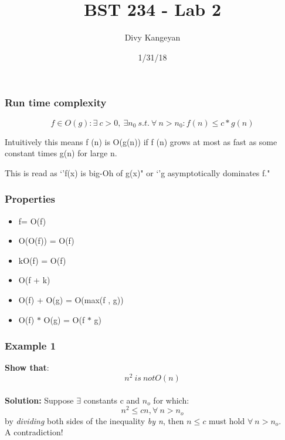 \documentclass{beamer}
\title[BST 234 Lab 2]{BST 234 - Lab 2} %
\author{Divy Kangeyan} %
\institute[ ] %
{
  \\ %
\medskip
\textit{ } %
}
\date{1/31/18}%
\begin{document}
\begin{frame}
\titlepage %
\end{frame}

 

 
 
\begin{frame}
\frametitle{Run time complexity}
 
$$f \in O(g) : \exists \ c>0, \ \exists n_{0} \ s.t. \ \forall \ n>n_{0} : f (n) \le  c*g(n)$$
 
\vspace{1.3cm}
Intuitively this means f (n) is O(g(n)) if f (n) grows at most as fast
as some constant times g(n) for large n. 


This is read as `'f(x) is big-Oh of g(x)" or `'g asymptotically dominates f."
 

\end{frame}



\begin{frame}
\frametitle{Properties}

\begin{itemize}
\item f= O(f) %
\item O(O(f)) = O(f)
\item kO(f) = O(f)
\item O(f + k)
\item O(f) + O(g) = O(max(f , g))
\item O(f) $*$ O(g) = O(f $*$ g)
\end{itemize}

\end{frame}

 

\begin{frame}
\frametitle{Example 1}
 \textbf{Show that}: $$n^{2} \ is \ not O(n) $$\\
 
\textbf{Solution:} Suppose $\exists$ constants c and
$n_{o}$ for which: $$n^{2}\leq cn, \forall \ n > n_{o} $$ 
by \textit{dividing} both sides of the inequality \textit{by n},
then $n\leq c$ must hold $\forall \ n>n_{o}$.  {\Large \textreferencemark} \\

A contradiction!

\end{frame}
\end{document}
